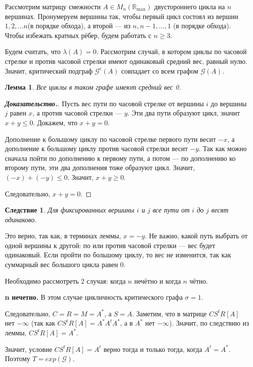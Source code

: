 \documentclass[12pt]{article}
\newtheorem{lemma}[theorem]{Лемма}
\newtheorem{corollary}[theorem]{Следствие}
\begin{document}
Рассмотрим матрицу смежности $A \in M_n(\mathbb{R}_{\max})$ двустороннего цикла на $n$ вершинах. Пронумеруем вершины так, чтобы первый цикл состоял из вершин $1, 2, \dots n$(в порядке обхода), а второй --- из $n, n - 1, \dots, 1$ (в порядке обхода). Чтобы избежать кратных рёбер, будем работать с $n \ge 3$.

Будем считать, что $\lambda(A) = 0$. Рассмотрим случай, в котором циклы по часовой стрелке и против часовой стрелки имеют одинаковый средний вес, равный нулю. Значит, критический подграф $\mathcal{G}^c(A)$ совпадает со всем графом $\mathcal{G}(A)$.
\begin{lemma}
Все циклы в таком графе имеют средний вес 0.
\end{lemma}
\begin{proof}[\textbf{Доказательство.}]
Пусть вес пути по часовой стрелке от вершины $i$ до вершины $j$ равен $x$, а против часовой стрелки --- $y$. Эти два пути образуют цикл, значит $x + y \le 0$. Докажем, что $x + y = 0$.

Дополнение к большому циклу по часовой стрелке первого пути весит $-x$, а дополнение к большому циклу против часовой стрелки весит $-y$. Так как можно сначала пойти по дополнению к первому пути, а потом --- по дополнению ко второму пути, эти два дополнения тоже образуют цикл. Значит, $(-x) + (-y) \le 0$. Значит, $x + y \ge 0$.

Следовательно, $x + y = 0$.
\end{proof}
\begin{corollary}
Для фиксированных вершины $i$ и $j$ все пути от $i$ до $j$ весят одинаково.
\end{corollary}

Это верно, так как, в терминах леммы, $x = -y$. Не важно, какой путь выбрать от одной вершины к другой: по или против часовой стрелки --- вес будет одинаковый. Если пройти по большому циклу, то вес не изменится, так как суммарный вес большого цикла равен $0$.

Необходимо рассмотреть 2 случая: когда $n$ нечётно и когда $n$ чётно.

\textbf{n нечетно.} В этом случае цикличность критического графа $\sigma = 1$.

Следовательно, $C = R = M = A^*$, а $S = A$. Заметим, что в матрице $CS^tR[A]$ нет $-\infty$ (так как $CS^tR[A] = A^*A^tA^*$, а в $A^*$ нет $-\infty$). Значит, по следствию из леммы, $CS^tR[A] = A^*$.

Значит, условие $CS^tR[A] = A^t$ верно тогда и только тогда, когда $A^t = A^*$. Поэтому $T = exp(\mathcal{G})$.
\end{document}
